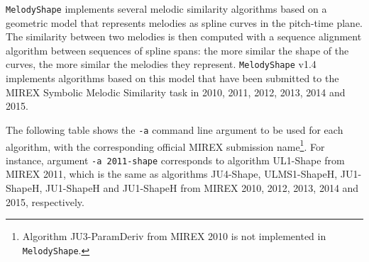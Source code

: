 \documentclass[twoside]{article}
\begin{document}
\texttt{MelodyShape} implements several melodic similarity algorithms based on a geometric model that represents melodies as spline curves in the pitch-time plane. The similarity between two melodies is then computed with a sequence alignment algorithm between sequences of spline spans: the more similar the shape of the curves, the more similar the melodies they represent. \texttt{MelodyShape} v1.4 implements algorithms based on this model that have been submitted to the MIREX Symbolic Melodic Similarity task in 2010, 2011, 2012, 2013, 2014 and 2015. 

The following table shows the \texttt{-a} command line argument to be used for each algorithm, with the corresponding official MIREX submission name\footnote{Algorithm \textsf{JU3-ParamDeriv} from MIREX 2010 is not implemented in \texttt{MelodyShape}.}. For instance, argument \texttt{-a 2011-shape} corresponds to algorithm \textsf{UL1-Shape} from MIREX 2011, which is the same as algorithms \textsf{JU4-Shape}, \textsf{ULMS1-ShapeH}, \textsf{JU1-ShapeH}, \textsf{JU1-ShapeH} and \textsf{JU1-ShapeH} from MIREX 2010, 2012, 2013, 2014 and 2015, respectively.
\end{document}
